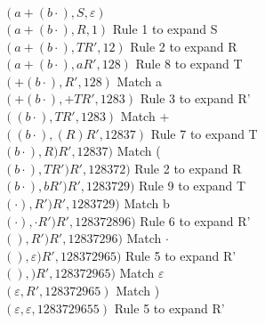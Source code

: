 \noindent $(a + (b\cdot), S, \varepsilon)$ \\
$(a + (b\cdot), R, 1)$ Rule 1 to expand S \\
$(a + (b\cdot), TR', 12)$ Rule 2 to expand R \\
$(a + (b\cdot), aR', 128)$ Rule 8 to expand T \\
$(+ (b\cdot), R', 128)$ Match a \\
$(+ (b\cdot), +TR', 1283)$ Rule 3 to expand R' \\
$( (b\cdot), TR', 1283)$ Match + \\
$( (b\cdot), (R)R', 12837)$ Rule 7 to expand T \\
$( b\cdot), R)R', 12837)$ Match ( \\
$( b\cdot), TR')R', 128372)$ Rule 2 to expand R \\
$( b\cdot), bR')R', 1283729)$ Rule 9 to expand T \\
$( \cdot), R')R', 1283729)$ Match b \\
$( \cdot), \cdot R')R', 128372896)$ Rule 6 to expand R' \\
$( ), R')R', 12837296)$ Match $\cdot$ \\
$( ), \varepsilon)R', 128372965)$ Rule 5 to expand R' \\
$( ), )R', 128372965)$ Match $\varepsilon$ \\
$(\varepsilon, R', 128372965)$ Match ) \\
$(\varepsilon, \varepsilon, 1283729655)$ Rule 5 to expand R' \\